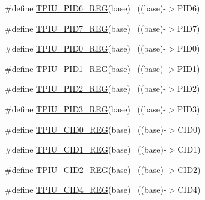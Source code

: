 \begin{DoxyCompactItemize}
\item 
\#define \hyperlink{group___t_p_i_u___register___accessor___macros_ga135cc7558ac7d8d2cce7535a7f2b2a0e}{T\+P\+I\+U\+\_\+\+P\+I\+D6\+\_\+\+R\+EG}(base)                                        ~((base)-\/$>$P\+I\+D6)
\item 
\#define \hyperlink{group___t_p_i_u___register___accessor___macros_ga4beab80bc710cd3ade8c413ed28052c2}{T\+P\+I\+U\+\_\+\+P\+I\+D7\+\_\+\+R\+EG}(base)                                        ~((base)-\/$>$P\+I\+D7)
\item 
\#define \hyperlink{group___t_p_i_u___register___accessor___macros_ga8e2ec990e5e23265bc0bb9a09ff6a164}{T\+P\+I\+U\+\_\+\+P\+I\+D0\+\_\+\+R\+EG}(base)                                        ~((base)-\/$>$P\+I\+D0)
\item 
\#define \hyperlink{group___t_p_i_u___register___accessor___macros_gafcbd8fadc083f6c8c9ae55edf780b9f8}{T\+P\+I\+U\+\_\+\+P\+I\+D1\+\_\+\+R\+EG}(base)                                        ~((base)-\/$>$P\+I\+D1)
\item 
\#define \hyperlink{group___t_p_i_u___register___accessor___macros_ga25559df859b61bb86a02cdc2004c6f30}{T\+P\+I\+U\+\_\+\+P\+I\+D2\+\_\+\+R\+EG}(base)                                        ~((base)-\/$>$P\+I\+D2)
\item 
\#define \hyperlink{group___t_p_i_u___register___accessor___macros_ga84d47dba808cfe2c3ce705e19b5fde1e}{T\+P\+I\+U\+\_\+\+P\+I\+D3\+\_\+\+R\+EG}(base)                                        ~((base)-\/$>$P\+I\+D3)
\item 
\#define \hyperlink{group___t_p_i_u___register___accessor___macros_gae0f119eaf4617470a270da91ce27f9fb}{T\+P\+I\+U\+\_\+\+C\+I\+D0\+\_\+\+R\+EG}(base)                                        ~((base)-\/$>$C\+I\+D0)
\item 
\#define \hyperlink{group___t_p_i_u___register___accessor___macros_ga3b9d84f25d7269b36d2c74fa5420450c}{T\+P\+I\+U\+\_\+\+C\+I\+D1\+\_\+\+R\+EG}(base)                                        ~((base)-\/$>$C\+I\+D1)
\item 
\#define \hyperlink{group___t_p_i_u___register___accessor___macros_ga5a60a1d412839185c0398f0b29153430}{T\+P\+I\+U\+\_\+\+C\+I\+D2\+\_\+\+R\+EG}(base)                                        ~((base)-\/$>$C\+I\+D2)
\item 
\#define \hyperlink{group___t_p_i_u___register___accessor___macros_ga887058c50d4ad4cfce8fefc4275e9dc2}{T\+P\+I\+U\+\_\+\+C\+I\+D4\+\_\+\+R\+EG}(base)                                        ~((base)-\/$>$C\+I\+D4)

\end{DoxyCompactItemize}
